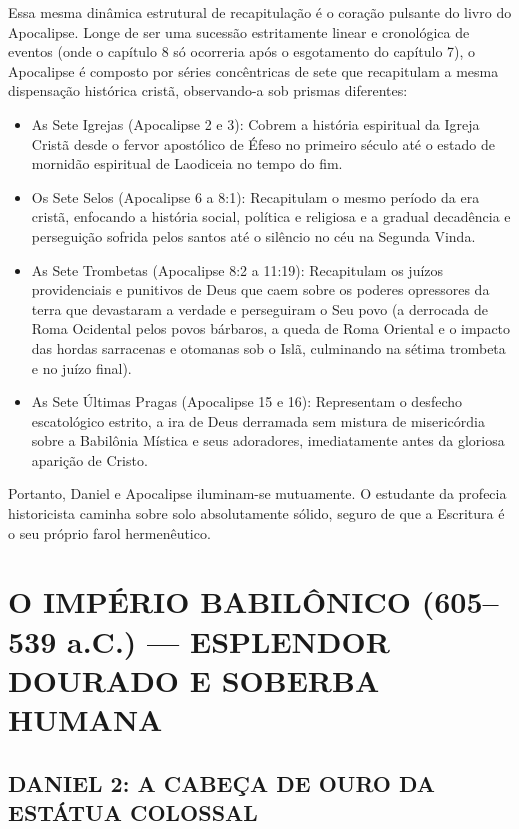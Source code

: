 Essa mesma dinâmica estrutural de recapitulação é o coração pulsante do livro do Apocalipse. Longe de ser uma sucessão estritamente linear e cronológica de eventos (onde o capítulo 8 só ocorreria após o esgotamento do capítulo 7), o Apocalipse é composto por séries concêntricas de sete que recapitulam a mesma dispensação histórica cristã, observando-a sob prismas diferentes:
\begin{itemize}
  \item As Sete Igrejas (Apocalipse 2 e 3): Cobrem a história espiritual da Igreja Cristã desde o fervor apostólico de Éfeso no primeiro século até o estado de mornidão espiritual de Laodiceia no tempo do fim.
  \item Os Sete Selos (Apocalipse 6 a 8:1): Recapitulam o mesmo período da era cristã, enfocando a história social, política e religiosa e a gradual decadência e perseguição sofrida pelos santos até o silêncio no céu na Segunda Vinda.
  \item As Sete Trombetas (Apocalipse 8:2 a 11:19): Recapitulam os juízos providenciais e punitivos de Deus que caem sobre os poderes opressores da terra que devastaram a verdade e perseguiram o Seu povo (a derrocada de Roma Ocidental pelos povos bárbaros, a queda de Roma Oriental e o impacto das hordas sarracenas e otomanas sob o Islã, culminando na sétima trombeta e no juízo final).
  \item As Sete Últimas Pragas (Apocalipse 15 e 16): Representam o desfecho escatológico estrito, a ira de Deus derramada sem mistura de misericórdia sobre a Babilônia Mística e seus adoradores, imediatamente antes da gloriosa aparição de Cristo.
\end{itemize}


Portanto, Daniel e Apocalipse iluminam-se mutuamente. O estudante da profecia historicista caminha sobre solo absolutamente sólido, seguro de que a Escritura é o seu próprio farol hermenêutico.



\section{O IMPÉRIO BABILÔNICO (605–539 a.C.) — ESPLENDOR DOURADO E SOBERBA HUMANA}



\subsection{DANIEL 2: A CABEÇA DE OURO DA ESTÁTUA COLOSSAL}



